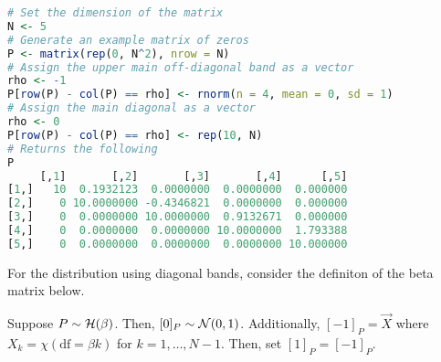 \begin{lstlisting}[language=R]
# Set the dimension of the matrix
N <- 5
# Generate an example matrix of zeros
P <- matrix(rep(0, N^2), nrow = N)
# Assign the upper main off-diagonal band as a vector
rho <- -1
P[row(P) - col(P) == rho] <- rnorm(n = 4, mean = 0, sd = 1)
# Assign the main diagonal as a vector
rho <- 0
P[row(P) - col(P) == rho] <- rep(10, N)
# Returns the following
P
     [,1]       [,2]       [,3]       [,4]      [,5]
[1,]   10  0.1932123  0.0000000  0.0000000  0.000000
[2,]    0 10.0000000 -0.4346821  0.0000000  0.000000
[3,]    0  0.0000000 10.0000000  0.9132671  0.000000
[4,]    0  0.0000000  0.0000000 10.0000000  1.793388
[5,]    0  0.0000000  0.0000000  0.0000000 10.000000
\end{lstlisting}


%
%

For the distribution using diagonal bands, consider the definiton of the beta matrix below. %

\ALGbeta

\begin{definition}
Suppose $P \sim \mathcal{H}(\beta)$. Then, $[0]_P \sim \mathcal{N}(0,1)$. Additionally, $[-1]_{P} = \vec{X}$ where $X_k = \chi(\text{df} = \beta k)$ for $k = 1,\dots,N-1$. Then, set $[1]_P = [-1]_P$.
\end{definition}


